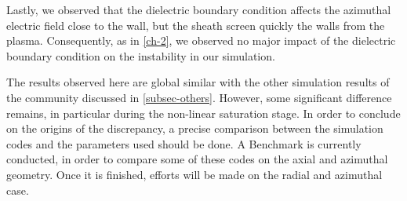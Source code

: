   \vspace{1ex}
  Lastly, we observed that the dielectric boundary condition affects the azimuthal electric field close to the wall, but the sheath screen quickly the walls from the plasma.
  Consequently, as in \cref{ch-2}, we observed no major impact of the dielectric boundary condition on the instability in our simulation.
  
  The results observed here are global similar with the other simulation results of the community discussed in \cref{subsec-others}.
  However, some significant difference remains, in particular during the non-linear saturation stage.
  In order to conclude on the origins of the discrepancy, a precise comparison between the simulation codes and the parameters used should be done.
  A Benchmark is currently conducted, in order to compare some of these codes on the axial and azimuthal geometry.
  Once it is finished, efforts will be made on the radial and azimuthal case.
  
  
